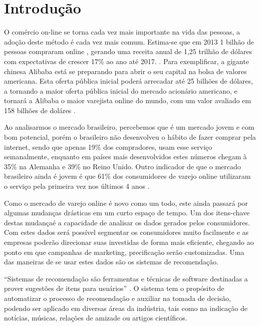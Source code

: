 \chapter[Introdução]{Introdução}
\label{chap:introducao}

O comércio on-line se torna cada vez mais importante na vida das pessoas, a adoção deste método é cada vez mais comum. Estima-se que em 2013 1 bilhão de pessoas compraram online \cite{emarketerB2CEcommerceClimbs}, gerando uma receita anual de 1,25 trilhão de dólares com expectativas de crescer 17\% ao ano até 2017. \cite{emarketerGlobalB2CSales}. Para exemplificar, a gigante chinesa Alibaba está se preparando para abrir o seu capital na bolsa de valores americana. Esta oferta pública inicial poderá arrecadar até 25 bilhões de dólares, a tornando a maior oferta pública inicial do mercado acionário americano, e tornará a Alibaba o maior varejista online do mundo, com um valor avaliado em 158 bilhões de doláres \cite{ForbesAlibabaBoostsIPO }.

Ao analisarmos o mercado brasileiro, percebemos que é um mercado jovem e com bom potencial, porém o brasileiro não desenvolveu o hábito de fazer comprar pela internet, sendo que apenas 19\% dos compradores, usam esse serviço semanalmente, enquanto em países mais desenvolvidos estes números chegam à 35\% na Alemanha e 39\% no Reino Unido. Outro indicador de que o mercado brasileiro ainda é jovem é que 61\% dos consumidores de varejo online utilizaram o serviço pela primeira vez nos últimos 4 anos \cite{PWC Total Retail}.

Como o mercado de varejo online é novo como um todo, este ainda passará por algumas mudanças drásticas em um curto espaço de tempo. Um dos itens-chave destas mudançaé a capacidade de analisar os dados gerados pelos consumidores. Com estes dados será possível segmentar os consumidores muito facilmente e as empresas poderão direcionar suas investidas de forma mais eficiente, chegando ao ponto em que campanhas de marketing, precificação serão customizadas. \cite{BCG The go to market revolution} Uma das maneiras de se usar estes dados são os sistemas de recomendação.

``Sistemas de recomendação são ferramentas e técnicas de software destinadas a prover sugestões de itens para usuários'' \cite{ricci2011introduction-chap1}. O sistema tem o propósito de automatizar o processo de recomendação e auxiliar na tomada de decisão, podendo ser aplicado em diversas áreas da indústria, tais como na indicação de notícias, músicas, relações de amizade ou artigos científicos.

